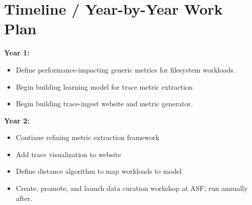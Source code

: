 \section{Timeline / Year-by-Year Work Plan}%
\label{sec:timeline}
\noindent
\textbf{Year 1:} 
\begin{itemize}
\item Define performance-impacting generic metrics for filesystem workloads.
\item Begin building learning model for trace metric extraction
\item Begin building trace-ingest website and metric generator.
\end{itemize}
\noindent
\textbf{Year 2:} 
\begin{itemize}
\item Continue refining metric extraction framework
\item Add trace visualization to website
\item Define distance algorithm to map workloads to model
\item Create, promote, and launch data curation workshop at ASF; run annually after.
\end{itemize}

